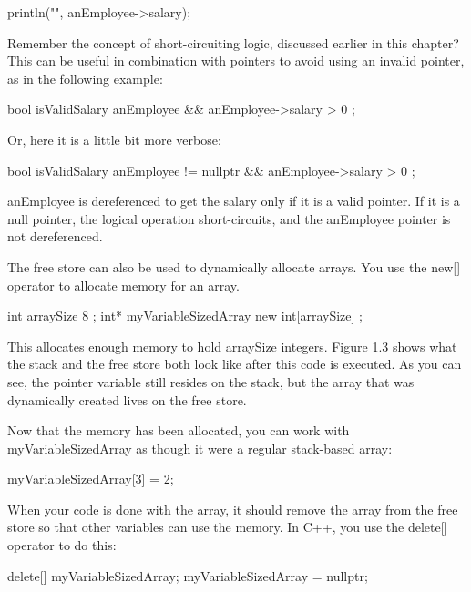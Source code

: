 \begin{cpp}
println("{}", anEmployee->salary);
\end{cpp}

Remember the concept of short-circuiting logic, discussed earlier in this chapter? This can be useful in combination with pointers to avoid using an invalid pointer, as in the following example:

\begin{cpp}
bool isValidSalary { anEmployee && anEmployee->salary > 0 };
\end{cpp}

Or, here it is a little bit more verbose:

\begin{cpp}
bool isValidSalary { anEmployee != nullptr && anEmployee->salary > 0 };
\end{cpp}

anEmployee is dereferenced to get the salary only if it is a valid pointer. If it is a null pointer, the logical operation short-circuits, and the anEmployee pointer is not dereferenced.


The free store can also be used to dynamically allocate arrays. You use the new[] operator to allocate memory for an array.

\begin{cpp}
int arraySize { 8 };
int* myVariableSizedArray { new int[arraySize] };
\end{cpp}

This allocates enough memory to hold arraySize integers. Figure 1.3 shows what the stack and the free store both look like after this code is executed. As you can see, the pointer variable still resides on the stack, but the array that was dynamically created lives on the free store.

Now that the memory has been allocated, you can work with myVariableSizedArray as though it were a regular stack-based array:

\begin{cpp}
myVariableSizedArray[3] = 2;
\end{cpp}

When your code is done with the array, it should remove the array from the free store so that other variables can use the memory. In C++, you use the delete[] operator to do this:

\begin{cpp}
delete[] myVariableSizedArray;
myVariableSizedArray = nullptr;
\end{cpp}

